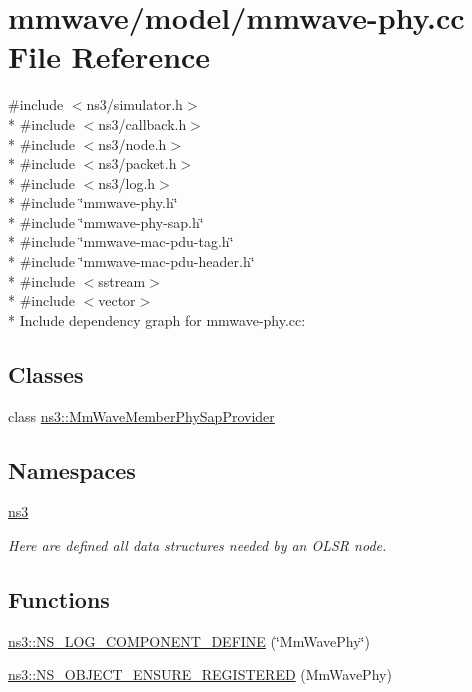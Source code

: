 \hypertarget{mmwave-phy_8cc}{}\section{mmwave/model/mmwave-\/phy.cc File Reference}
\label{mmwave-phy_8cc}
{\ttfamily \#include $<$ns3/simulator.\+h$>$}\\*
{\ttfamily \#include $<$ns3/callback.\+h$>$}\\*
{\ttfamily \#include $<$ns3/node.\+h$>$}\\*
{\ttfamily \#include $<$ns3/packet.\+h$>$}\\*
{\ttfamily \#include $<$ns3/log.\+h$>$}\\*
{\ttfamily \#include \char`\"{}mmwave-\/phy.\+h\char`\"{}}\\*
{\ttfamily \#include \char`\"{}mmwave-\/phy-\/sap.\+h\char`\"{}}\\*
{\ttfamily \#include \char`\"{}mmwave-\/mac-\/pdu-\/tag.\+h\char`\"{}}\\*
{\ttfamily \#include \char`\"{}mmwave-\/mac-\/pdu-\/header.\+h\char`\"{}}\\*
{\ttfamily \#include $<$sstream$>$}\\*
{\ttfamily \#include $<$vector$>$}\\*
Include dependency graph for mmwave-\/phy.cc\+:
\subsection*{Classes}
\begin{DoxyCompactItemize}
\item 
class \hyperlink{classns3_1_1MmWaveMemberPhySapProvider}{ns3\+::\+Mm\+Wave\+Member\+Phy\+Sap\+Provider}
\end{DoxyCompactItemize}
\subsection*{Namespaces}
\begin{DoxyCompactItemize}
\item 
 \hyperlink{namespacens3}{ns3}
\begin{DoxyCompactList}\small\item\em Here are defined all data structures needed by an O\+L\+SR node. \end{DoxyCompactList}\end{DoxyCompactItemize}
\subsection*{Functions}
\begin{DoxyCompactItemize}
\item 
\hyperlink{namespacens3_a686946bda0cee9ddd4053fbf439deb3f}{ns3\+::\+N\+S\+\_\+\+L\+O\+G\+\_\+\+C\+O\+M\+P\+O\+N\+E\+N\+T\+\_\+\+D\+E\+F\+I\+NE} (\char`\"{}Mm\+Wave\+Phy\char`\"{})
\item 
\hyperlink{namespacens3_a3c5e305da9bd863ef9bc0a009b631d93}{ns3\+::\+N\+S\+\_\+\+O\+B\+J\+E\+C\+T\+\_\+\+E\+N\+S\+U\+R\+E\+\_\+\+R\+E\+G\+I\+S\+T\+E\+R\+ED} (Mm\+Wave\+Phy)
\end{DoxyCompactItemize}
